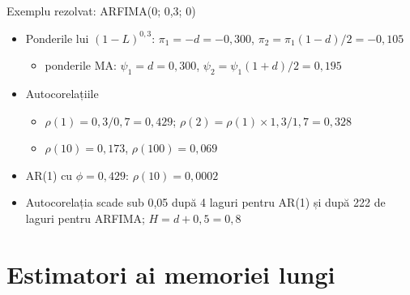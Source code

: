 \begin{frame}{Exemplu rezolvat: ARFIMA(0; 0,3; 0)}
\itemsize{\small}
\begin{itemize}
    \item Ponderile lui $(1 - L)^{0{,}3}$: $\pi_1 = -d = -0{,}300$, $\pi_2 = \pi_1(1 - d)/2 = -0{,}105$
    \begin{itemize}
        \item ponderile MA: $\psi_1 = d = 0{,}300$, $\psi_2 = \psi_1(1 + d)/2 = 0{,}195$
    \end{itemize}
    \item Autocorelațiile
    \begin{itemize}
        \item $\rho(1) = 0{,}3/0{,}7 = 0{,}429$; $\rho(2) = \rho(1) \times 1{,}3/1{,}7 = 0{,}328$
        \item $\rho(10) = 0{,}173$, $\rho(100) = 0{,}069$
    \end{itemize}
    \item AR(1) cu $\phi = 0{,}429$: $\rho(10) = 0{,}0002$
    \item Autocorelația scade sub 0,05 după 4 laguri pentru AR(1) și după 222 de laguri pentru ARFIMA; $H = d + 0{,}5 = 0{,}8$
\end{itemize}
\end{frame}


\section{Estimatori ai memoriei lungi}


